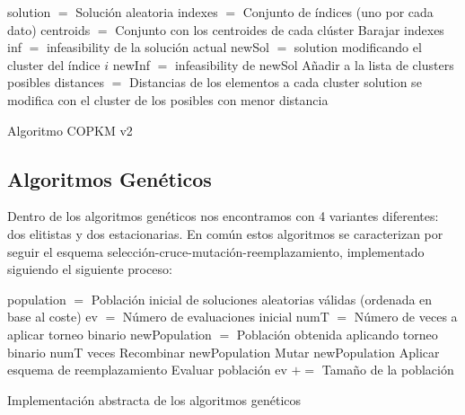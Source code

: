 \begin{algorithm}[H]
    \SetAlgoLined
        solution $=$ Solución aleatoria \;
        indexes $=$ Conjunto de índices (uno por cada dato) \;
        centroids $=$ Conjunto con los centroides de cada clúster \;
        Barajar indexes \;
         {
             {
                inf $=$ infeasibility de la solución actual \;
                 {
                    newSol $=$ solution modificando el cluster del índice $i$ \;
                    newInf $=$ infeasibility de newSol \;
                     {
                        Añadir a la lista de clusters posibles \;
                    }
                }
                distances $=$ Distancias de los elementos a cada cluster \;
                solution se modifica con el cluster de los posibles con menor distancia \; 
            }
        }
    \caption{Algoritmo COPKM v2}
\end{algorithm}

\newpage


\subsection{Algoritmos Genéticos}

Dentro de los algoritmos genéticos nos encontramos con 4 variantes diferentes: dos elitistas y dos estacionarias. En común estos algoritmos se caracterizan por seguir el esquema selección-cruce-mutación-reemplazamiento, implementado siguiendo el siguiente proceso: \\

\begin{algorithm}[H]
    \SetAlgoLined
        population $=$ Población inicial de soluciones aleatorias válidas (ordenada en base al coste) \;
        ev $=$ Número de evaluaciones inicial \;
        numT $=$ Número de veces a aplicar torneo binario \;
         {
            newPopulation $=$ Población obtenida aplicando torneo binario numT veces \;
            Recombinar newPopulation \;
            Mutar newPopulation \;
            Aplicar esquema de reemplazamiento \;
            Evaluar población \;
            ev $+=$ Tamaño de la población \;            
        }
    \caption{Implementación abstracta de los algoritmos genéticos}
\end{algorithm}

